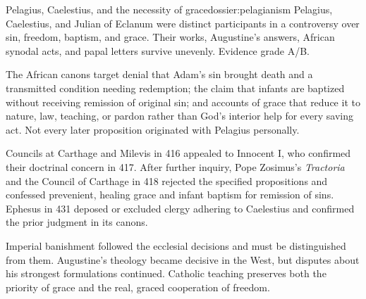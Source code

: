 \begin{heresydossier}{Pelagius, Caelestius, and the necessity of grace}{dossier:pelagianism}
\objectfield Pelagius, Caelestius, and Julian of Eclanum were distinct participants in a controversy over sin, freedom, baptism, and grace. Their works, Augustine's answers, African synodal acts, and papal letters survive unevenly. Evidence grade A/B.

\propositionfield The African canons target denial that Adam's sin brought death and a transmitted condition needing redemption; the claim that infants are baptized without receiving remission of original sin; and accounts of grace that reduce it to nature, law, teaching, or pardon rather than God's interior help for every saving act. Not every later proposition originated with Pelagius personally.

\responsefield Councils at Carthage and Milevis in 416 appealed to Innocent I, who confirmed their doctrinal concern in 417. After further inquiry, Pope Zosimus's \emph{Tractoria} and the Council of Carthage in 418 rejected the specified propositions and confessed prevenient, healing grace and infant baptism for remission of sins. Ephesus in 431 deposed or excluded clergy adhering to Caelestius and confirmed the prior judgment in its canons.

\aftermathfield Imperial banishment followed the ecclesial decisions and must be distinguished from them. Augustine's theology became decisive in the West, but disputes about his strongest formulations continued. Catholic teaching preserves both the priority of grace and the real, graced cooperation of freedom.
\end{heresydossier}

